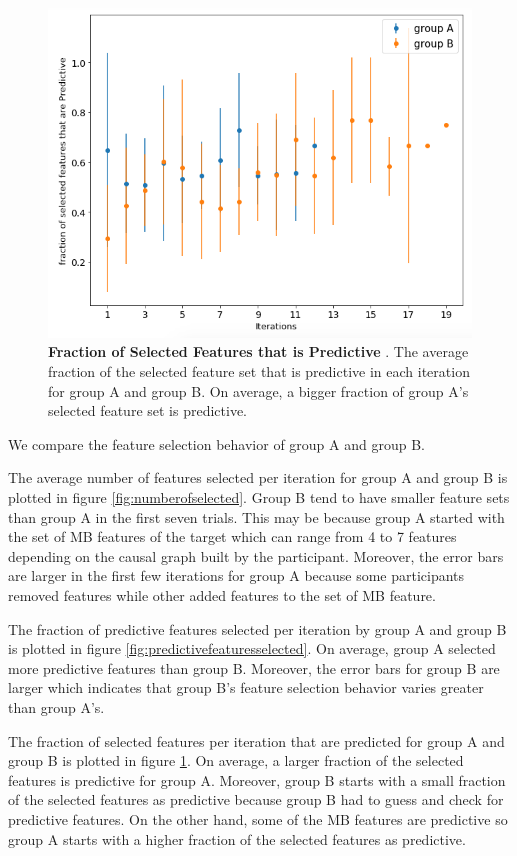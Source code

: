 \begin{figure}
    \centering
    \includegraphics[width=.75\textwidth]{selectedfeaturethatarepredictive}
    \caption{\textbf{Fraction of Selected Features that is Predictive }. The average fraction of the selected feature set that is predictive in each iteration for group A and group B. On average, a bigger fraction of group A's selected feature set is predictive. }
    \label{fig:selectedfeaturethatarepredictive}
\end{figure}

We compare the feature selection behavior of group A and group B. 

The average number of features selected per iteration for group A and group B is plotted in figure \ref{fig:numberofselected}. Group B tend to have smaller feature sets than group A in the first seven trials. This may be because group A started with the set of MB features of the target which can range from 4 to 7 features depending on the causal graph built by the participant. Moreover, the error bars are larger in the first few iterations for group A because some participants removed features while other added features to the set of MB feature. 

The fraction of predictive features selected per iteration by group A and group B is plotted in figure \ref{fig:predictivefeaturesselected}. On average, group A selected more predictive features than group B. Moreover, the error bars for group B are larger which indicates that group B's feature selection behavior varies greater than group A's. 

The fraction of selected features per iteration that are predicted for group A and group B is plotted in figure \ref{fig:selectedfeaturethatarepredictive}. On average, a larger fraction of the selected features is predictive for group A. Moreover, group B starts with a small fraction of the selected features as predictive because group B had to guess and check for predictive features. On the other hand, some of the MB features are predictive so group A starts with a higher fraction of the selected features as predictive. 

